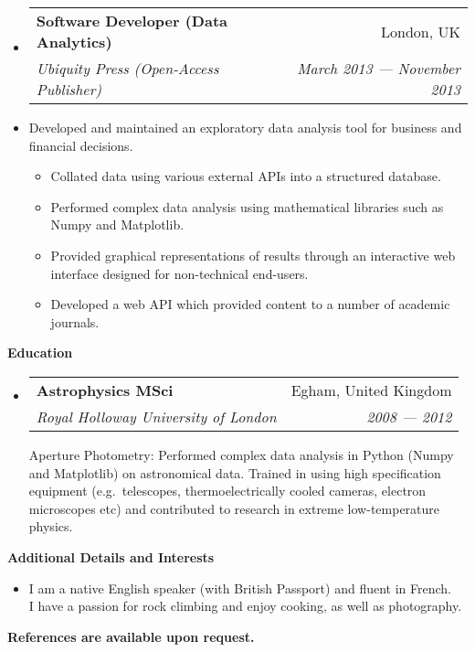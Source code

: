 \documentclass[letterpaper,11pt]{article}
\makeatletter
\newlength{\headinglength}
\newcommand{\resheading}[1]{{\large \colorbox{mygrey}
        {\begin{minipage}{\headinglength}
            {\textbf{#1 \vphantom{p\^{E}}}}
        \end{minipage}}}}
\newcommand{\ressubheading}[4]
    {\begin{tabular*}{180mm}{l@{\extracolsep{\fill}}r}
        \textbf{#1} & #2 \\
        \textit{#3} & \textit{#4} \\
    \end{tabular*}\vspace{-6pt}}
\newcommand{\resdescription}[1]{#1 \vspace{-0mm}}
\newcommand{\resitem}[1]{\item #1 \vspace{-2pt}}
\makeatother
\begin{document}
\begin{itemize}
        \item[]
            \ressubheading{Software Developer (Data Analytics)}{London, UK}{Ubiquity Press (Open-Access Publisher)}{March 2013 --- November 2013}
        \item[]
            \resdescription{Developed and maintained an exploratory data analysis tool for business and financial decisions.}
            \begin{itemize}
                    \resitem{Collated data using various external APIs into a structured database.}
                    \resitem{Performed complex data analysis using mathematical libraries such as Numpy and Matplotlib.}
                    \resitem{Provided graphical representations of results through an interactive web interface designed for non-technical end-users.}
                    \resitem{Developed a web API which provided content to a number of academic journals.}
            \end{itemize}

    \end{itemize}

    \resheading{Education}
    \begin{itemize}
        \item[]
            \ressubheading{Astrophysics MSci }{Egham, United Kingdom}{Royal Holloway University of London}{2008 --- 2012}
            \vspace{0.2in}
            \vspace{0.0in}
            \resdescription{Aperture Photometry: Performed complex data analysis in Python (Numpy and Matplotlib) on astronomical data.
            Trained in using high specification equipment  (e.g.\ telescopes, thermoelectrically cooled cameras, electron microscopes etc) and contributed to research in extreme low-temperature physics.}

    \end{itemize}

    \resheading{Additional Details and Interests}
    \begin{itemize}
        \item[]
            I am a native English speaker (with British Passport) and fluent in French.\\
            I have a passion for rock climbing and enjoy cooking, as well as photography. \\
    \end{itemize}

    \textbf{References are available upon request.}
\end{document}
